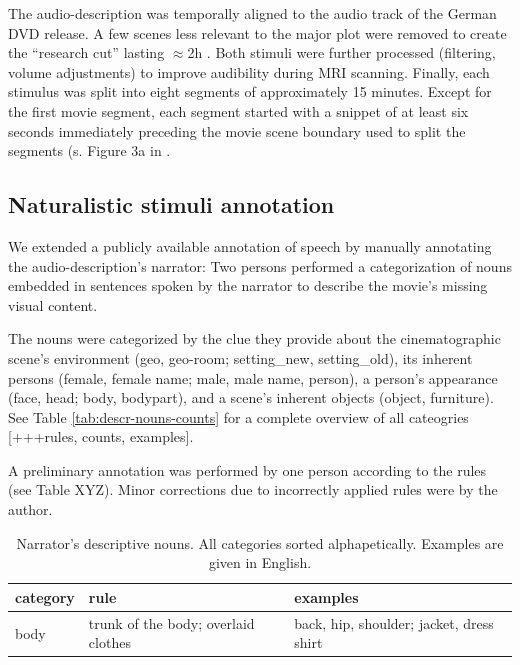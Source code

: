 \documentclass[english]{article}
\begin{document}
The audio-description was temporally aligned to the audio track of the German
DVD release. A few scenes less relevant to the major plot were removed to create
the ``research cut'' lasting $\approx$2h
\citep{hanke2014audiomovie, hanke2016simultaneous}. Both stimuli were further
processed (filtering, volume adjustments) to improve audibility during MRI
scanning. Finally, each stimulus was split into eight segments of approximately
15 minutes.  Except for the first movie segment, each segment started with a
snippet of at least six seconds immediately preceding the movie scene boundary
used to split the segments (s. Figure 3a in \citep{hanke2014audiomovie}.



\subsection{Naturalistic stimuli annotation}


We extended a publicly available annotation of speech \citep{haeusler2020speechanno} by manually annotating the audio-description's narrator: Two persons performed a categorization of nouns embedded in sentences spoken by the narrator to describe the movie's missing visual content.


The nouns were categorized by the clue they provide about the cinematographic
scene's environment (geo, geo-room; setting\_new, setting\_old), its inherent
persons (female, female name; male, male name, person), a person's appearance
(face, head; body, bodypart), and a scene's inherent objects (object,
furniture). See Table \ref{tab:descr-nouns-counts} for a complete overview of all
cateogries [+++rules, counts, examples].

A preliminary annotation was performed by one person according to the rules (see
Table XYZ). Minor corrections due to incorrectly applied rules were by the
author.

\begin{table}[t]
    \caption{Narrator's descriptive nouns.
        All categories sorted alphapetically.
    Examples are given in English.}
\label{tab:descr-nouns-count}
\begin{tabular}{lll}
\toprule
\textbf{category} & \textbf{rule} & \textbf{examples} \\
\midrule
body & trunk of the body; overlaid clothes & back, hip, shoulder; jacket, dress
shirt \tabularnewline
\bottomrule
\end{tabular}
\end{table}
\end{document}
